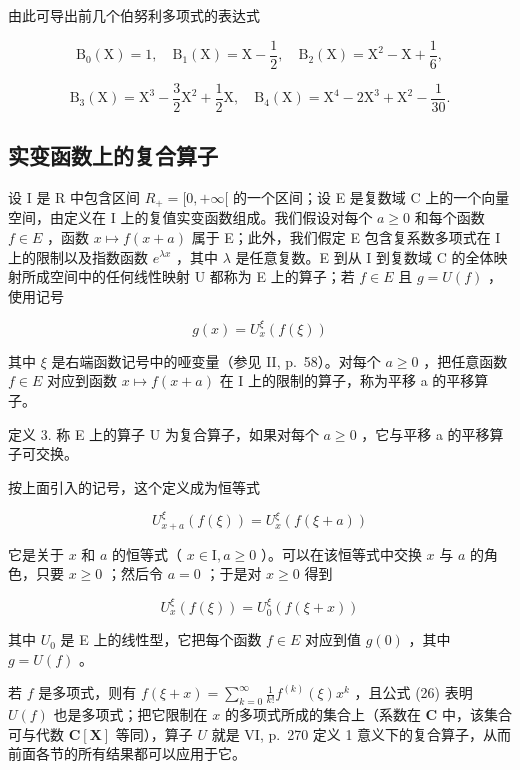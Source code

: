 由此可导出前几个伯努利多项式的表达式

\[
\mathrm{B} _ {0} (\mathrm{X}) = 1, \quad \mathrm{B} _ {1} (\mathrm{X}) = \mathrm{X} - \frac {1}{2}, \quad \mathrm{B} _ {2} (\mathrm{X}) = \mathrm{X} ^ {2} - \mathrm{X} + \frac {1}{6},
\]

\[
\mathrm{B} _ {3} (\mathrm{X}) = \mathrm{X} ^ {3} - \frac {3}{2} \mathrm{X} ^ {2} + \frac {1}{2} \mathrm{X}, \quad \mathrm{B} _ {4} (\mathrm{X}) = \mathrm{X} ^ {4} - 2 \mathrm{X} ^ {3} + \mathrm{X} ^ {2} - \frac {1}{3 0}.
\]

\subsection{实变函数上的复合算子}

设 I 是 R 中包含区间 \(R_{+} = [0, +\infty[\) 的一个区间；设 E 是复数域 C 上的一个向量空间，由定义在 I 上的复值实变函数组成。我们假设对每个 \(a \geqslant 0\) 和每个函数 \(f \in E\) ，函数 \(x \mapsto f(x + a)\) 属于 E；此外，我们假定 E 包含复系数多项式在 I 上的限制以及指数函数 \(e^{\lambda x}\) ，其中 \(\lambda\) 是任意复数。E 到从 I 到复数域 C 的全体映射所成空间中的任何线性映射 U 都称为 E 上的算子；若 \(f \in E\) 且 \(g = U(f)\) ，使用记号

\[
g (x) = U _ {x} ^ {\xi} \left(f (\xi)\right)
\]

其中 \(\xi\) 是右端函数记号中的哑变量（参见 II, p.~58）。对每个 \(a \geqslant 0\) ，把任意函数 \(f \in E\) 对应到函数 \(x \mapsto f(x + a)\) 在 I 上的限制的算子，称为平移 a 的平移算子。

定义 3. 称 E 上的算子 U 为复合算子，如果对每个 \(a \geqslant 0\) ，它与平移 a 的平移算子可交换。

按上面引入的记号，这个定义成为恒等式

\[
U _ {x + a} ^ {\xi} (f (\xi)) = U _ {x} ^ {\xi} (f (\xi + a))\tag{25}
\]

它是关于 \(x\) 和 \(a\) 的恒等式（ \(x \in \mathrm{I}, a \geqslant 0\) ）。可以在该恒等式中交换 \(x\) 与 \(a\) 的角色，只要 \(x \geqslant 0\) ；然后令 \(a = 0\) ；于是对 \(x \geqslant 0\) 得到

\[
U _ {x} ^ {\xi} (f (\xi)) = U _ {0} ^ {\xi} (f (\xi + x))\tag{26}
\]

其中 \(U_{0}\) 是 E 上的线性型，它把每个函数 \(f \in E\) 对应到值 \(g(0)\) ，其中 \(g = U(f)\) 。

若 \(f\) 是多项式，则有 \(f(\xi + x) = \sum_{k=0}^{\infty} \frac{1}{k!} f^{(k)}(\xi)x^k\) ，且公式 (26) 表明 \(U(f)\) 也是多项式；把它限制在 \(x\) 的多项式所成的集合上（系数在 \(\mathbf{C}\) 中，该集合可与代数 \(\mathbf{C}[\mathbf{X}]\) 等同），算子 \(U\) 就是 VI, p.~270 定义 1 意义下的复合算子，从而前面各节的所有结果都可以应用于它。

